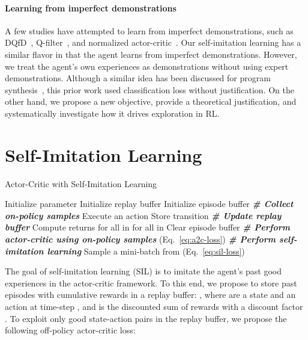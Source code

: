 \documentclass{article}
\newcommand{\cutsectionup}{\vspace*{-0.08in}}\newcommand{\cutsectiondown}{\vspace*{-0.05in}}
\newcommand{\cutparagraphup}{\vspace*{-0.05in}}\newcommand{\cutparagraphdown}{\vspace*{-0.02in}}
\begin{document}
\cutparagraphup
\paragraph{Learning from imperfect demonstrations}
A few studies have attempted to learn from imperfect demonstrations, such as DQfD~\citep{hester2018deep}, Q-filter~\citep{Nair2017OvercomingEI}, and normalized actor-critic~\citep{xu2017learning}. Our self-imitation learning has a similar flavor in that the agent learns from imperfect demonstrations. However, we treat the agent's own experiences as demonstrations without using expert demonstrations. Although a similar idea has been discussed for program synthesis~\citep{liang2016neural,abolafia2018neural}, this prior work used classification loss without justification. On the other hand, we propose a new objective, provide a theoretical justification, and systematically investigate how it drives exploration in RL.

\cutsectionup
\section{Self-Imitation Learning} \label{sec:method} 
\cutsectiondown
\begin{algorithm}[tb]
\caption{Actor-Critic with Self-Imitation Learning}
\label{alg:sil}
\begin{algorithmic}
\STATE Initialize parameter 
\STATE Initialize replay buffer 
\STATE Initialize episode buffer 
	\STATE \textbf{\textit{\# Collect on-policy samples}}
		\STATE Execute an action 
		\STATE Store transition 
	\ENDFOR
		\STATE \textbf{\textit{\# Update replay buffer}}
		\STATE Compute returns  for all  in 			
		\STATE  for all  in 
		\STATE Clear episode buffer 
\ENDIF
	\STATE \textbf{\textit{\# Perform actor-critic using on-policy samples}}
	\STATE  \hfill (Eq.~\ref{eq:a2c-loss})
    \STATE \textbf{\textit{\# Perform self-imitation learning}}
	    \STATE Sample a mini-batch  from 
		\STATE  \hfill (Eq.~\ref{eq:sil-loss})
	\ENDFOR
\ENDFOR
\vskip -0.1in
\end{algorithmic}
\end{algorithm}


The goal of self-imitation learning (SIL) is to imitate the agent's past good experiences in the actor-critic framework. To this end, we propose to store past episodes with cumulative rewards in a replay buffer: , where  are a state and an action at time-step , and  is the discounted sum of rewards with a discount factor . To exploit only good state-action pairs in the replay buffer, we propose the following off-policy actor-critic loss:
\end{document}
